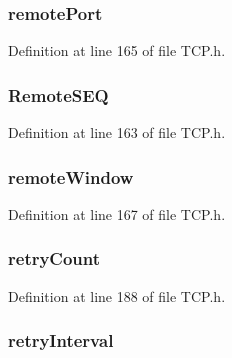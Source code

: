 \subsubsection[{remote\+Port}]{ remote\+Port}\label{struct_t_c_b_aa316e3d5bcdbc999280ce3bb80ef116e}


Definition at line 165 of file T\+C\+P.\+h.

\hypertarget{struct_t_c_b_ad819775df364f9ddf85d4568ffe1ed18}{}
\subsubsection[{Remote\+S\+E\+Q}]{ Remote\+S\+E\+Q}\label{struct_t_c_b_ad819775df364f9ddf85d4568ffe1ed18}


Definition at line 163 of file T\+C\+P.\+h.

\hypertarget{struct_t_c_b_a856e07e4c4285f8a0f28518aed9fc2bd}{}
\subsubsection[{remote\+Window}]{ remote\+Window}\label{struct_t_c_b_a856e07e4c4285f8a0f28518aed9fc2bd}


Definition at line 167 of file T\+C\+P.\+h.

\hypertarget{struct_t_c_b_a122f749211c26b45afbac25b4a278b56}{}
\subsubsection[{retry\+Count}]{ retry\+Count}\label{struct_t_c_b_a122f749211c26b45afbac25b4a278b56}


Definition at line 188 of file T\+C\+P.\+h.

\hypertarget{struct_t_c_b_a807f78c2939992452223356ae72340cf}{}
\subsubsection[{retry\+Interval}]{ retry\+Interval}\label{struct_t_c_b_a807f78c2939992452223356ae72340cf}


